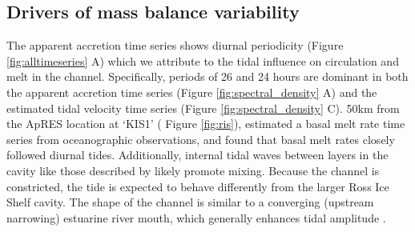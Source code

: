 



\subsection{Drivers of mass balance variability}

The apparent accretion time series shows diurnal periodicity (Figure \ref{fig:alltimeseries} A) which we attribute to the tidal influence on circulation and melt in the channel. 
Specifically, periods of 26 and 24 hours are dominant in both the apparent accretion time series (Figure \ref{fig:spectral_density} A) and the estimated tidal velocity time series (Figure \ref{fig:spectral_density} C).
50km from the ApRES location at `KIS1' ( Figure \ref{fig:ris}), \cite{robinson2020ice} estimated a basal melt rate time series from oceanographic observations, and found that basal melt rates closely followed diurnal tides. 
Additionally, internal tidal waves between layers in the cavity like those described by \cite{robinson2020ice} likely promote mixing.  Because the channel is constricted, the tide is expected to behave differently from the larger Ross Ice Shelf cavity. The shape of the channel is similar to a converging (upstream narrowing) estuarine river mouth, which generally enhances tidal amplitude \citep{van2011analytical}.

